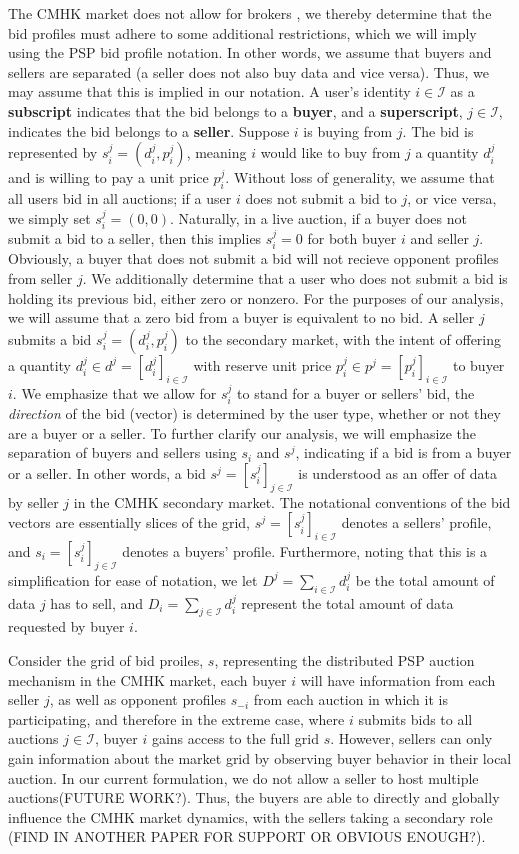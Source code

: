\documentclass[sigconf, anonymous]{acmart}
\newcommand{\mcI}{\mathcal{I}}
\theoremstyle{definition}
\begin{document}
The CMHK market does not allow for brokers \cite{cmhk}, we thereby determine that
the bid profiles must adhere to some additional restrictions, which we will
imply using the PSP bid profile notation. In other words, we assume that buyers and sellers are
separated (a seller does not also buy data and vice versa). Thus, we may assume
that this is implied in our notation.
A user's identity $i \in \mcI$ as a \textbf{subscript} indicates that the bid
belongs to a \textbf{buyer}, and a \textbf{superscript}, $j\in\mcI$, indicates
the bid belongs to a \textbf{seller}.
Suppose $i$ is buying from $j$. The bid is represented by $s_i^j = (d_i^j, p_i^j)$, 
meaning $i$ would like to buy from $j$ a quantity $d^j_i$ and is willing to pay
a unit price $p^j_i$. Without loss of generality, we assume that all users bid in all
auctions; if a user $i$ does not submit a bid to $j$, or vice versa, we simply set $s_i^j =
(0,0)$. Naturally, in a live auction, if a buyer does
not submit a bid to a seller, then this implies $s_i^j = 0$ for both buyer $i$
and seller $j$. Obviously, a buyer that does not submit a bid will not recieve opponent profiles from seller
$j$. We additionally determine that a user who does not submit a bid is holding
its previous bid, either zero or nonzero. For the purposes of our analysis, we will assume that a zero bid from a
buyer is equivalent to no bid.
A seller $j$ submits a bid $s_i^j = (d_i^j, p_i^j)$ to the secondary market,
with the intent of offering a
quantity $d_i^j \in d^j = [d_i^j]_{i\in\mcI}$ 
with reserve unit price $p_i^j \in p^j = [p_i^j]_{i\in\mcI}$ to buyer $i$. We emphasize that we allow for $s_i^j$ to
stand for a buyer or sellers' bid, the \emph{direction} of the bid (vector) is determined
by the user type, whether or not they are  a buyer or a seller. 
To further clarify our analysis, we will emphasize the separation of buyers and
sellers using
$s_i$ and $s^j$, indicating if a bid is from a buyer or a seller.
In other words, a bid $s^j =
[s_i^j]_{j\in\mcI}$ is understood as an offer of data by seller $j$ in the CMHK
secondary market. The notational conventions of the bid vectors are essentially 
slices of the grid, $s^j = [s_i^j]_{i\in\mcI}$ denotes a sellers' profile, and $s_i =
[s_i^j]_{j\in\mcI}$ denotes a buyers' profile. 
Furthermore, noting that this is a simplification for ease of notation, we let $D^j = \sum_{i\in\mcI}
d_i^j$ be the total amount of data $j$ has to sell, and $D_i = \sum_{j\in\mcI}
d_i^j$ represent the
total amount of data requested by buyer $i$. 

Consider the grid of bid proiles, $s$, representing the distributed PSP auction
mechanism in the CMHK market, each buyer $i$ will
have information from each seller $j$, as well as opponent profiles $s_{-i}$
from each auction in which it is participating, and therefore
in the extreme case, where $i$ submits bids to all auctions $j\in\mcI$, buyer
$i$ gains access to the full grid $s$. However, 
sellers can only gain information about the market grid by observing buyer
behavior in their local auction.
In our current formulation, we do not allow a seller to host multiple
auctions(FUTURE WORK?). Thus, the buyers are able to directly and globally
influence the CMHK market dynamics, with the sellers taking a secondary role
(FIND IN ANOTHER PAPER FOR SUPPORT OR OBVIOUS ENOUGH?).
\end{document}
